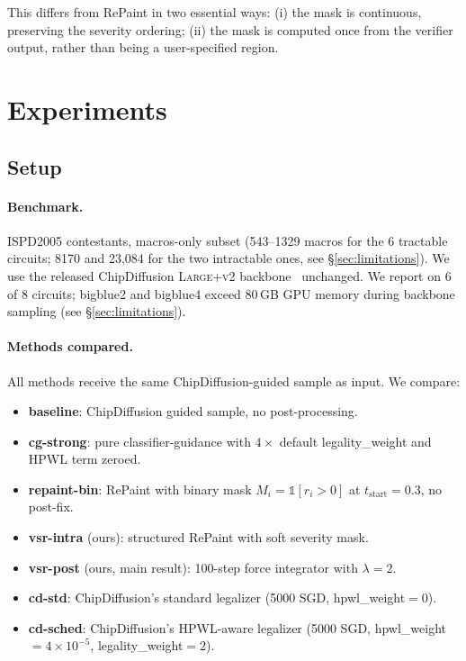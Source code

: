 \documentclass{article}
\begin{document}
This differs from RePaint in two essential ways: (i) the mask is continuous,
preserving the severity ordering; (ii) the mask is computed once from the
verifier output, rather than being a user-specified region.

\section{Experiments}
\label{sec:results}

\subsection{Setup}
\paragraph{Benchmark.}  ISPD2005 contestants, macros-only subset
(543--1329 macros for the 6 tractable circuits; 8170 and 23,084 for the two
intractable ones, see \S\ref{sec:limitations}).  We use the released
ChipDiffusion \textsc{Large+v2} backbone~\cite{chipdiffusion} unchanged.
We report on 6 of 8 circuits; bigblue2 and bigblue4 exceed 80\,GB GPU
memory during backbone sampling (see \S\ref{sec:limitations}).

\paragraph{Methods compared.}  All methods receive the same
ChipDiffusion-guided sample as input.  We compare:
\begin{itemize}
\item \textbf{baseline}: ChipDiffusion guided sample, no post-processing.
\item \textbf{cg-strong}: pure classifier-guidance with $4\times$ default
legality\_weight and HPWL term zeroed.
\item \textbf{repaint-bin}: RePaint with binary mask $M_i = \mathbb{1}[r_i>0]$ at
$t_{\text{start}}=0.3$, no post-fix.
\item \textbf{vsr-intra} (ours): structured RePaint with soft severity mask.
\item \textbf{vsr-post} (ours, main result): 100-step force integrator with
$\lambda=2$.
\item \textbf{cd-std}: ChipDiffusion's standard legalizer (5000 SGD,
hpwl\_weight$=0$).
\item \textbf{cd-sched}: ChipDiffusion's HPWL-aware legalizer (5000 SGD,
hpwl\_weight$=4\!\times\!10^{-5}$, legality\_weight$=2$).
\end{itemize}
\end{document}

